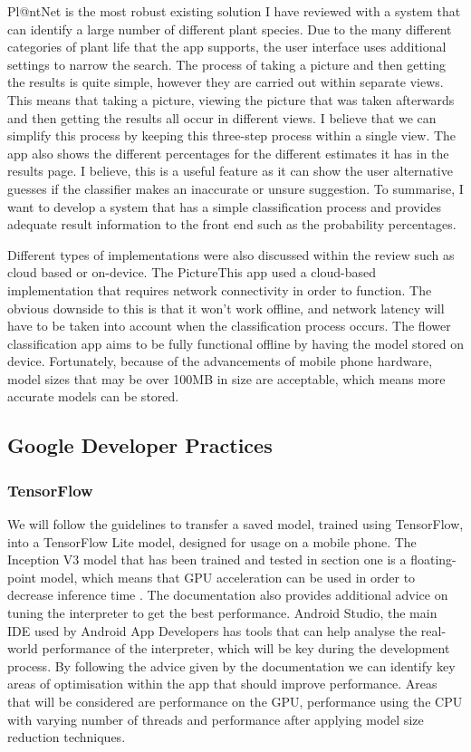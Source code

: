 \documentclass[12pt,a4paper]{report}
\begin{document}
\par

Pl@ntNet is the most robust existing solution I have reviewed with a system that can identify a large number of 
different plant species. Due to the many different categories of plant life that the app supports, the user interface 
uses additional settings to narrow the search. The process of taking a picture and then getting the results is quite 
simple, however they are carried out within separate views.  This means that taking a picture, viewing the picture that 
was taken afterwards and then getting the results all occur in different views. I believe that we can simplify this 
process by keeping this three-step process within a single view. The app also shows the different percentages for the 
different estimates it has in the results page. I believe, this is a useful feature as it can show the user alternative 
guesses if the classifier makes an inaccurate or unsure suggestion. To summarise, I want to develop a system that has a 
simple classification process and provides adequate result information to the front end such as the probability 
percentages. 

Different types of implementations were also discussed within the review such as cloud based or on-device. 
The PictureThis app used a cloud-based implementation that requires network connectivity in order to function. 
The obvious downside to this is that it won't work offline, and network latency will have to be taken into account when 
the classification process occurs. The flower classification app aims to be fully functional offline by having the model
stored on device. Fortunately, because of the advancements of mobile phone hardware, model sizes that may be over 100MB 
in size are acceptable, which means more accurate models can be stored.

\subsection{Google Developer Practices}

\subsubsection{TensorFlow}

We will follow the guidelines to transfer a saved model, trained using TensorFlow, into a TensorFlow Lite model, 
designed for usage on a mobile phone. The Inception V3 model that has been trained and tested in section one is a 
floating-point model, which means that GPU acceleration can be used in order to decrease inference time 
\citep{TFGPU}. The documentation also provides additional advice on tuning the interpreter to get the best 
performance. Android Studio, the main IDE used by Android App Developers has tools that can help analyse the 
real-world performance of the interpreter, which will be key during the development process. By following the advice 
given by the documentation we can identify key areas of optimisation within the app that should improve performance. 
Areas that will be considered are performance on the GPU, performance using the CPU with varying number of threads and  
performance after applying model size reduction techniques.
\end{document}
